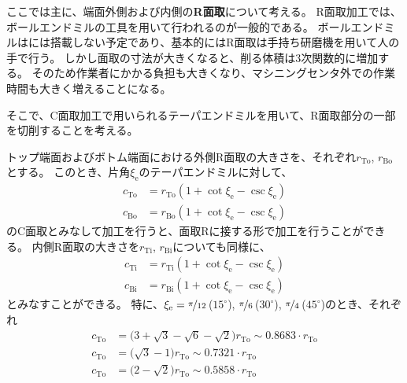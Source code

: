 


ここでは主に、端面外側および内側の\textbf{R面取}について考える。
R面取加工では、ボールエンドミルの工具を用いて行われるのが一般的である。
ボールエンドミルは\DMname には搭載しない予定であり、基本的にはR面取は手持ち研磨機を用いて人の手で行う。
しかし面取の寸法が大きくなると、削る体積は3次関数的に増加する。
そのため作業者にかかる負担も大きくなり、マシニングセンタ外での作業時間も大きく増えることになる。

そこで、C面取加工で用いられるテーパエンドミルを用いて、R面取部分の一部を切削することを考える。

トップ端面およびボトム端面における外側R面取の大きさを、それぞれ$r_\mathrm{To}$, $r_\mathrm{Bo}$とする。
このとき、片角$\xi_\mathrm e$のテーパエンドミルに対して、
\begin{align*}
  c_\mathrm{To} &= r_\mathrm{To}\left(1+\cot\xi_\mathrm e-\csc\xi_\mathrm e\right)\\
  c_\mathrm{Bo} &= r_\mathrm{Bo}\left(1+\cot\xi_\mathrm e-\csc\xi_\mathrm e\right)
\end{align*}
のC面取とみなして加工を行うと、面取Rに接する形で加工を行うことができる。
内側R面取の大きさを$r_\mathrm{Ti}$, $r_\mathrm{Bi}$についても同様に、
\begin{align*}
  c_\mathrm{Ti} &= r_\mathrm{Ti}\left(1+\cot\xi_\mathrm e-\csc\xi_\mathrm e\right)\\
  c_\mathrm{Bi} &= r_\mathrm{Bi}\left(1+\cot\xi_\mathrm e-\csc\xi_\mathrm e\right)
\end{align*}
とみなすことができる。
特に、$\xi_\mathrm e = \nicefrac\pi{12}$\,($15^\circ$), $\nicefrac\pi6$\,($30^\circ$), $\nicefrac\pi4$\,($45^\circ$)のとき、それぞれ
\begin{align*}
  c_\mathrm{To} &= \big(3+\sqrt3-\sqrt6-\sqrt2\big)r_\mathrm{To} \sim 0.8683\cdot r_\mathrm{To}\\
  c_\mathrm{To} &= \big(\sqrt3-1\big)r_\mathrm{To} \sim 0.7321\cdot r_\mathrm{To}\\
  c_\mathrm{To} &= \big(2-\sqrt2\big)r_\mathrm{To} \sim 0.5858\cdot r_\mathrm{To}
\end{align*}

